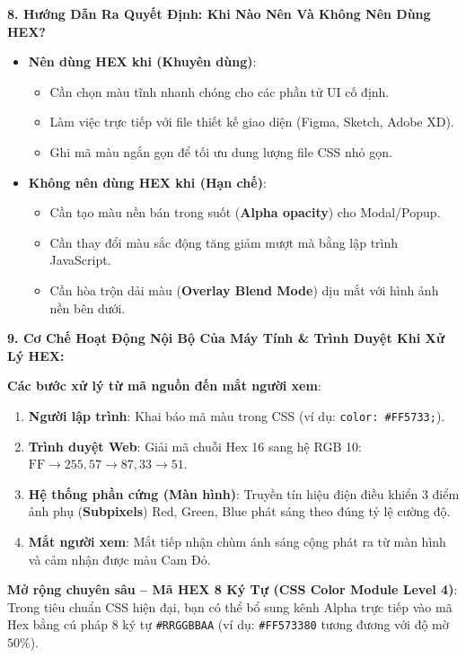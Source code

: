 \documentclass[11pt,oneside]{book}
\newcommand{\codeinline}[1]{\textcolor{accentOrange}{\texttt{#1}}}
\newcommand{\term}[1]{\textbf{\textcolor{primaryBlue}{#1}}}
\begin{document}
\textbf{8. Hướng Dẫn Ra Quyết Định: Khi Nào Nên Và Không Nên Dùng HEX?}

\begin{conceptBox}
\begin{itemize}[leftmargin=1.5em, itemsep=3pt, parsep=0pt]
    \item \textbf{Nên dùng HEX khi (\textcolor{green!60!black}{\textbf{Khuyên dùng}})}:
    \begin{itemize}[leftmargin=1.2em, itemsep=2pt]
        \item Cần chọn màu tĩnh nhanh chóng cho các phần tử UI cố định.
        \item Làm việc trực tiếp với file thiết kế giao diện (Figma, Sketch, Adobe XD).
        \item Ghi mã màu ngắn gọn để tối ưu dung lượng file CSS nhỏ gọn.
    \end{itemize}
    \item \textbf{Không nên dùng HEX khi (\textcolor{red!80!black}{\textbf{Hạn chế}})}:
    \begin{itemize}[leftmargin=1.2em, itemsep=2pt]
        \item Cần tạo màu nền bán trong suốt (\term{Alpha opacity}) cho Modal/Popup.
        \item Cần thay đổi màu sắc động tăng giảm mượt mà bằng lập trình JavaScript.
        \item Cần hòa trộn dải màu (\term{Overlay Blend Mode}) dịu mắt với hình ảnh nền bên dưới.
    \end{itemize}
\end{itemize}
\end{conceptBox}

\textbf{9. Cơ Chế Hoạt Động Nội Bộ Của Máy Tính \& Trình Duyệt Khi Xử Lý HEX:}

\begin{conceptBox}
\textbf{Các bước xử lý từ mã nguồn đến mắt người xem}:
\begin{enumerate}[leftmargin=1.5em, itemsep=3pt, parsep=0pt]
    \item \textbf{Người lập trình}: Khai báo mã màu trong CSS (ví dụ: \codeinline{color: \#FF5733;}).
    \item \textbf{Trình duyệt Web}: Giải mã chuỗi Hex 16 sang hệ RGB 10: $\text{FF} \rightarrow 255, 57 \rightarrow 87, 33 \rightarrow 51$.
    \item \textbf{Hệ thống phần cứng (Màn hình)}: Truyền tín hiệu điện điều khiển 3 điểm ảnh phụ (\term{Subpixels}) Red, Green, Blue phát sáng theo đúng tỷ lệ cường độ.
    \item \textbf{Mắt người xem}: Mắt tiếp nhận chùm ánh sáng cộng phát ra từ màn hình và cảm nhận được màu Cam Đỏ.
\end{enumerate}

\textbf{Mở rộng chuyên sâu -- Mã HEX 8 Ký Tự (CSS Color Module Level 4)}:
Trong tiêu chuẩn CSS hiện đại, bạn có thể bổ sung kênh Alpha trực tiếp vào mã Hex bằng cú pháp 8 ký tự \codeinline{\#RRGGBBAA} (ví dụ: \codeinline{\#FF573380} tương đương với độ mờ $50\%$).
\end{conceptBox}
\end{document}
